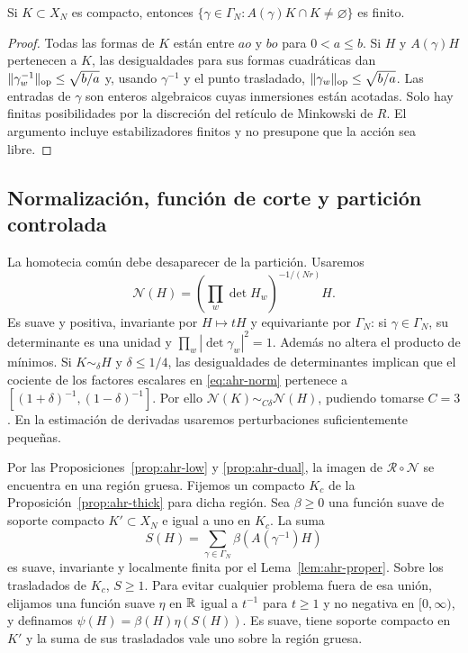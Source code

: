 \begin{lema}
\label{lem:ahr-proper}
Si $K\subset X_N$ es compacto, entonces $\{\gamma\in\Gamma_N:A(\gamma)K\cap K\ne\varnothing\}$ es finito.
\end{lema}
\begin{proof}
Todas las formas de $K$ están entre $a o$ y $b o$ para $0<a\le b$. Si $H$ y $A(\gamma)H$ pertenecen a $K$, las desigualdades para sus formas cuadráticas dan $\|\gamma_w^{-1}\|_{\rm op}\le\sqrt{b/a}$ y, usando $\gamma^{-1}$ y el punto trasladado, $\|\gamma_w\|_{\rm op}\le\sqrt{b/a}$. Las entradas de $\gamma$ son enteros algebraicos cuyas inmersiones están acotadas. Solo hay finitas posibilidades por la discreción del retículo de Minkowski de $R$. El argumento incluye estabilizadores finitos y no presupone que la acción sea libre.
\end{proof}

\subsection{Normalización, función de corte y partición controlada}

La homotecia común debe desaparecer de la partición. Usaremos
\begin{equation}
 \mathcal N(H)=\left(\prod_w\det H_w\right)^{-1/(Nr)} H.
 \label{eq:ahr-norm}
\end{equation}
Es suave y positiva, invariante por $H\mapsto tH$ y equivariante por $\Gamma_N$: si $\gamma\in\Gamma_N$, su determinante es una unidad y $\prod_w|\det\gamma_w|^2=1$. Además no altera el producto de mínimos. Si $K\sim_\delta H$ y $\delta\le1/4$, las desigualdades de determinantes implican que el cociente de los factores escalares en \eqref{eq:ahr-norm} pertenece a $[(1+\delta)^{-1},(1-\delta)^{-1}]$. Por ello $\mathcal N(K)\sim_{C\delta}\mathcal N(H)$, pudiendo tomarse $C=3$. En la estimación de derivadas usaremos perturbaciones suficientemente pequeñas.

Por las Proposiciones~\ref{prop:ahr-low} y \ref{prop:ahr-dual}, la imagen de $\mathcal R\circ\mathcal N$ se encuentra en una región gruesa. Fijemos un compacto $K_c$ de la Proposición~\ref{prop:ahr-thick} para dicha región. Sea $\beta\ge0$ una función suave de soporte compacto $K'\subset X_N$ e igual a uno en $K_c$. La suma
\[
 S(H)=\sum_{\gamma\in\Gamma_N}\beta(A(\gamma^{-1})H)
\]
es suave, invariante y localmente finita por el Lema~\ref{lem:ahr-proper}. Sobre los trasladados de $K_c$, $S\ge1$. Para evitar cualquier problema fuera de esa unión, elijamos una función suave $\eta$ en $\mathbb{R}$ igual a $t^{-1}$ para $t\ge1$ y no negativa en $[0,\infty)$, y definamos $\psi(H)=\beta(H)\eta(S(H))$. Es suave, tiene soporte compacto en $K'$ y la suma de sus trasladados vale uno sobre la región gruesa.


